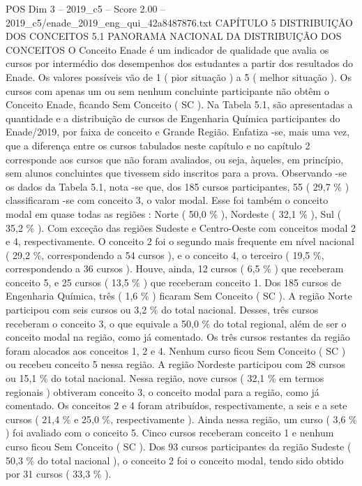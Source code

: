 \begin{textsample}{POS Dim 3 – 2019\_c5 – Score 2.00 – 2019\_c5/enade\_2019\_eng\_qui\_42a8487876.txt}  \label{ex:f3_pos_073}
CAPÍTULO 5 DISTRIBUIÇÃO DOS CONCEITOS 5.1 PANORAMA NACIONAL DA DISTRIBUIÇÃO DOS CONCEITOS O Conceito Enade é um indicador de qualidade que avalia os cursos por intermédio dos desempenhos dos estudantes a partir dos resultados do Enade.
Os valores possíveis vão de 1 ( pior situação ) a 5 ( melhor situação ).
Os cursos com apenas um ou sem nenhum concluinte participante não obtêm o Conceito Enade, ficando Sem Conceito ( SC ).
Na Tabela 5.1, são apresentadas a quantidade e a distribuição de cursos de Engenharia Química participantes do Enade/2019, por faixa de conceito e Grande Região.
Enfatiza -se, mais uma vez, que a diferença entre os cursos tabulados neste capítulo e no capítulo 2 corresponde aos cursos que não foram avaliados, ou seja, àqueles, em princípio, sem alunos concluintes que tivessem sido inscritos para a prova.
Observando -se os dados da Tabela 5.1, nota -se que, dos 185 cursos participantes, 55 ( 29,7 \% ) classificaram -se com conceito 3, o valor modal.
Esse foi também o conceito modal em quase todas as regiões : Norte ( 50,0 \% ), Nordeste ( 32,1 \% ), Sul ( 35,2 \% ).
Com exceção das regiões Sudeste e Centro-Oeste com conceitos modal 2 e 4, respectivamente.
O conceito 2 foi o segundo mais frequente em nível nacional ( 29,2 \%, correspondendo a 54 cursos ), e o conceito 4, o terceiro ( 19,5 \%, correspondendo a 36 cursos ).
Houve, ainda, 12 cursos ( 6,5 \% ) que receberam conceito 5, e 25 cursos ( 13,5 \% ) que receberam conceito 1.
Dos 185 cursos de Engenharia Química, três ( 1,6 \% ) ficaram Sem Conceito ( SC ).
A região Norte participou com seis cursos ou 3,2 \% do total nacional.
Desses, três cursos receberam o conceito 3, o que equivale a 50,0 \% do total regional, além de ser o conceito modal na região, como já comentado.
Os três cursos restantes da região foram alocados aos conceitos 1, 2 e 4.
Nenhum curso ficou Sem Conceito ( SC ) ou recebeu conceito 5 nessa região.
A região Nordeste participou com 28 cursos ou 15,1 \% do total nacional.
Nessa região, nove cursos ( 32,1 \% em termos regionais ) obtiveram conceito 3, o conceito modal para a região, como já comentado.
Os conceitos 2 e 4 foram atribuídos, respectivamente, a seis e a sete cursos ( 21,4 \% e 25,0 \%, respectivamente ).
Ainda nessa região, um curso ( 3,6 \% ) foi avaliado com o conceito 5.
Cinco cursos receberam conceito 1 e nenhum curso ficou Sem Conceito ( SC ).
Dos 93 cursos participantes da região Sudeste ( 50,3 \% do total nacional ), o conceito 2 foi o conceito modal, tendo sido obtido por 31 cursos ( 33,3 \% ).

\end{textsample}
